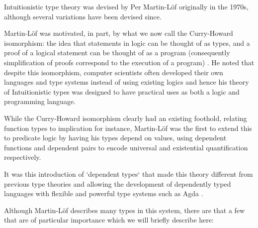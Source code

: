 \documentclass{ProgressReport}[2020/09/15]
\begin{document}
          Intuitionistic type theory was devised by Per Martin-Löf
          \cite{martinlof1980} originally in the 1970s, although
          several variations have been devised since.

          Martin-Löf was motivated, in part, by what we now call the
          Curry-Howard isomorphism: the idea that statements in logic can be
          thought of as types, and a proof of a logical statement can
          be thought of as a program (consequently simplification of
          proofs correspond to the execution of a program)
          \cite{wadler2015}. He noted that despite this isomorphism,
          computer scientists often developed their own
          languages and type systems instead of using existing
          logics and hence his theory of Intuitionistic types was
          designed to have practical uses as both a logic and
          programming language.

          While the Curry-Howard isomorphism clearly had an existing
          foothold, relating function types to implication for
          instance, Martin-Löf was the first to extend this to
          predicate logic by having his types depend on values,
          using dependent functions and dependent pairs to encode
          universal and existential quantification respectively.

          It was this introduction of `dependent types` that made this
          theory different from previous type theories and allowing
          the development of dependently typed languages with flexible
          and powerful type systems such as Agda \cite{norell}.

          Although Martin-Löf describes many types in this system,
          there are that a few that are of particular importance which we will
          briefly describe here: 
\end{document}
